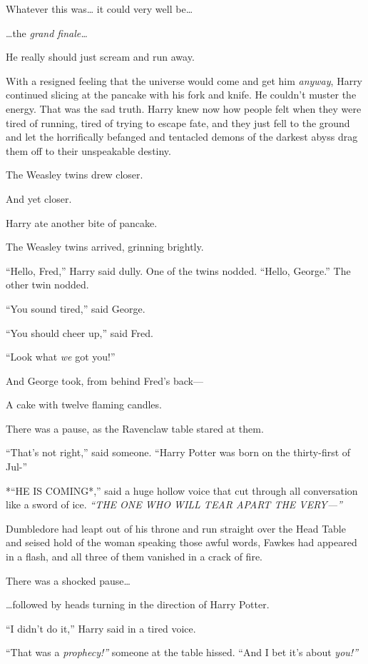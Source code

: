 Whatever this was\ldots{} it could very well be\ldots{}

\ldots{}the \emph{grand finale\ldots{}}

He really should just scream and run away.

With a resigned feeling that the universe would come and get him
\emph{anyway}, Harry continued slicing at the pancake with his fork and
knife. He couldn't muster the energy. That was the sad truth. Harry knew
now how people felt when they were tired of running, tired of trying to
escape fate, and they just fell to the ground and let the horrifically
befanged and tentacled demons of the darkest abyss drag them off to
their unspeakable destiny.

The Weasley twins drew closer.

And yet closer.

Harry ate another bite of pancake.

The Weasley twins arrived, grinning brightly.

``Hello, Fred,'' Harry said dully. One of the twins nodded. ``Hello,
George.'' The other twin nodded.

``You sound tired,'' said George.

``You should cheer up,'' said Fred.

``Look what \emph{we} got you!''

And George took, from behind Fred's back---

A cake with twelve flaming candles.

There was a pause, as the Ravenclaw table stared at them.

``That's not right,'' said someone. ``Harry Potter was born on the
thirty-first of Jul-''

*``HE IS COMING*,'' said a huge hollow voice that cut through all
conversation like a sword of ice. \emph{``THE ONE WHO WILL TEAR APART
THE VERY---''}

Dumbledore had leapt out of his throne and run straight over the Head
Table and seised hold of the woman speaking those awful words, Fawkes
had appeared in a flash, and all three of them vanished in a crack of
fire.

There was a shocked pause\ldots{}

\ldots{}followed by heads turning in the direction of Harry Potter.

``I didn't do it,'' Harry said in a tired voice.

``That was a \emph{prophecy!''} someone at the table hissed. ``And I bet
it's about \emph{you!''}

